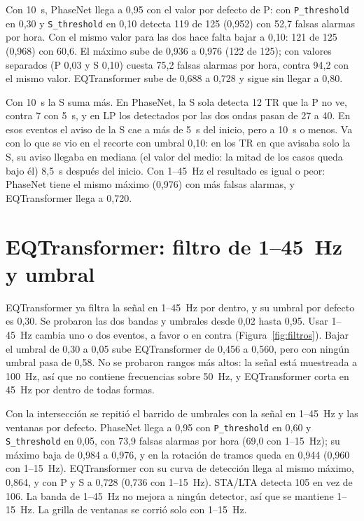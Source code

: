 \documentclass[11pt,a4paper,oneside,spanish,oldfontcommands]{memoir}
\begin{document}
Con 10~s, PhaseNet llega a 0,95 con el valor por defecto de P: con
\texttt{P\_threshold} en 0,30 y \texttt{S\_threshold} en 0,10 detecta 119 de
125 (0,952) con 52,7 falsas alarmas por hora. Con el mismo valor para las dos
hace falta bajar a 0,10: 121 de 125 (0,968) con 60,6. El máximo sube de 0,936 a
0,976 (122 de 125); con valores separados (P 0,03 y S 0,10) cuesta 75,2 falsas
alarmas por hora, contra 94,2 con el mismo valor. EQTransformer sube de 0,688 a
0,728 y sigue sin llegar a 0,80.

Con 10~s la S suma más. En PhaseNet, la S sola detecta 12 TR que la P no ve,
contra 7 con 5~s, y en LP los detectados por las dos ondas pasan de 27 a 40. En
esos eventos el aviso de la S cae a más de 5~s del inicio, pero a 10~s o menos.
Va con lo que se vio en el recorte con umbral 0,10: en los TR en que avisaba
solo la S, su aviso llegaba en mediana (el valor del medio: la mitad de los
casos queda bajo él) 8,5~s después del inicio. Con 1--45~Hz el resultado es
igual o peor: PhaseNet tiene el mismo máximo (0,976) con más falsas alarmas, y
EQTransformer llega a 0,720.

\section{EQTransformer: filtro de 1--45~Hz y umbral}\label{sec:filtro}

EQTransformer ya filtra la señal en 1--45~Hz por dentro, y su umbral por
defecto es 0,30. Se probaron las dos bandas y umbrales desde 0,02 hasta 0,95. Usar
1--45~Hz cambia uno o dos eventos, a favor o en contra
(Figura~\ref{fig:filtros}). Bajar el umbral de 0,30 a 0,05 sube
EQTransformer de 0,456 a 0,560, pero con ningún umbral pasa de 0,58. No se
probaron rangos más altos: la señal está muestreada a 100~Hz, así que no contiene
frecuencias sobre 50~Hz, y EQTransformer corta en 45~Hz por dentro de todas
formas.

Con la intersección se repitió el barrido de umbrales con la señal en
1--45~Hz y las ventanas por defecto. PhaseNet llega a 0,95 con
\texttt{P\_threshold} en 0,60 y \texttt{S\_threshold} en 0,05, con 73,9
falsas alarmas por hora (69,0 con 1--15~Hz); su máximo baja de 0,984 a 0,976, y
en la rotación de tramos queda en 0,944 (0,960 con 1--15~Hz). EQTransformer con
su curva de detección llega al mismo máximo, 0,864, y con P y S a 0,728 (0,736
con 1--15~Hz). STA/LTA detecta 105 en vez de 106. La banda de 1--45~Hz no mejora
a ningún detector, así que se mantiene 1--15~Hz. La grilla de ventanas se corrió
solo con 1--15~Hz.
\end{document}
